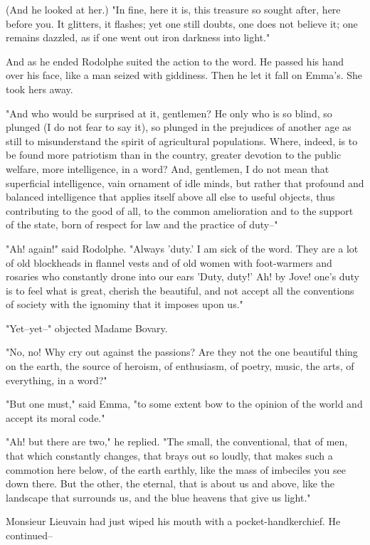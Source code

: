 \documentclass{tufte-book}
\begin{document}
(And he looked at her.) "In fine, here it is, this treasure so sought
after, here before you. It glitters, it flashes; yet one still doubts,
one does not believe it; one remains dazzled, as if one went out iron
darkness into light."

And as he ended Rodolphe suited the action to the word. He passed his
hand over his face, like a man seized with giddiness. Then he let it
fall on Emma's. She took hers away.

"And who would be surprised at it, gentlemen? He only who is so blind,
so plunged (I do not fear to say it), so plunged in the prejudices
of another age as still to misunderstand the spirit of agricultural
populations. Where, indeed, is to be found more patriotism than in the
country, greater devotion to the public welfare, more intelligence, in a
word? And, gentlemen, I do not mean that superficial intelligence,
vain ornament of idle minds, but rather that profound and balanced
intelligence that applies itself above all else to useful objects, thus
contributing to the good of all, to the common amelioration and to
the support of the state, born of respect for law and the practice of
duty--"

"Ah! again!" said Rodolphe. "Always 'duty.' I am sick of the word.
They are a lot of old blockheads in flannel vests and of old women with
foot-warmers and rosaries who constantly drone into our ears 'Duty,
duty!' Ah! by Jove! one's duty is to feel what is great, cherish the
beautiful, and not accept all the conventions of society with the
ignominy that it imposes upon us."

"Yet--yet--" objected Madame Bovary.

"No, no! Why cry out against the passions? Are they not the one
beautiful thing on the earth, the source of heroism, of enthusiasm, of
poetry, music, the arts, of everything, in a word?"

"But one must," said Emma, "to some extent bow to the opinion of the
world and accept its moral code."

"Ah! but there are two," he replied. "The small, the conventional, that
of men, that which constantly changes, that brays out so loudly, that
makes such a commotion here below, of the earth earthly, like the mass
of imbeciles you see down there. But the other, the eternal, that is
about us and above, like the landscape that surrounds us, and the blue
heavens that give us light."

Monsieur Lieuvain had just wiped his mouth with a pocket-handkerchief.
He continued--
\end{document}
